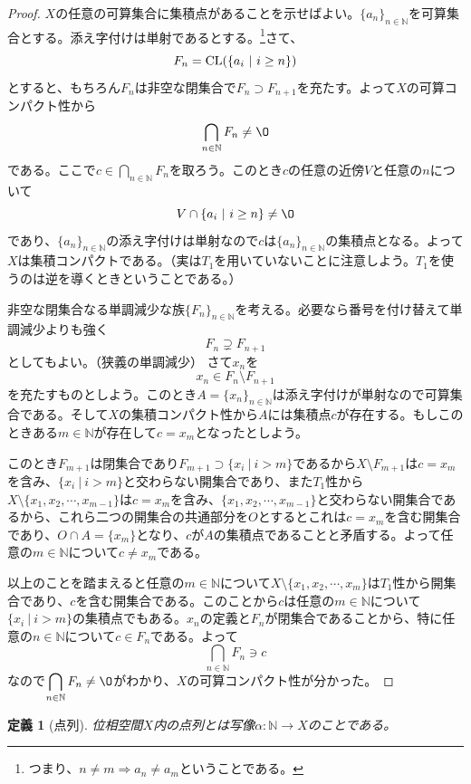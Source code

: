 \documentclass[leqno]{jsarticle}
\newtheorem{df}[thm]{定義}
\newcommand{\nn}{\mathbb{N}}
\newcommand{\al}{\alpha}
\newcommand{\cl}{\text{{\rm CL}}}
\begin{document}
\begin{proof}\par
[可算コンパクト$\Longrightarrow$集積コンパクトの証明]\par
$X$の任意の可算集合に集積点があることを示せばよい。$\{a_n\}_{n\in \mathbb{N}}$を可算集合とする。添え字付けは単射であるとする。\footnote{つまり、$n\neq m\Longrightarrow a_n\neq a_m$ということである。}さて、
\[
F_n=\cl(\{a_i\ |\ i\ge n\})
\]
とすると、もちろん$F_n$は非空な閉集合で$F_n\supset F_{n+1}$を充たす。よって$X$の可算コンパクト性から
\[
\bigcap_{n\in \mathbb{N}}F_n\neq\O
\]
である。ここで$\displaystyle c \in \bigcap_{n\in \mathbb{N}}F_n$を取ろう。このとき$c$の任意の近傍$V$と任意の$n$について
\[
V\cap \{a_i\ |\ i\ge n\}\neq\O
\]
であり、$\{a_n\}_{n\in \mathbb{N}}$の添え字付けは単射なので$c$は$\{a_n\}_{n\in \mathbb{N}}$の集積点となる。よって$X$は集積コンパクトである。（実は$T_1$を用いていないことに注意しよう。$T_1$を使うのは逆を導くときということである。）\par
[可算コンパクト$\Longrightarrow$集積コンパクトの証明終わり]\par
[集積コンパクト$\Longrightarrow$可算コンパクトの証明]\par
非空な閉集合なる単調減少な族$\{F_n\}_{n\in \mathbb{N}}$を考える。必要なら番号を付け替えて単調減少よりも強く
\[
F_n\supsetneq F_{n+1}
\]
としてもよい。（狭義の単調減少）
さて$x_n$を
\[
x_n\in F_n\setminus F_{n+1}
\]
を充たすものとしよう。このとき$A=\{x_n\}_{n\in\mathbb{N}}$は添え字付けが単射なので可算集合である。そして$X$の集積コンパクト性から$A$には集積点$c$が存在する。もしこのときある$m\in \mathbb{N}$が存在して$c=x_m$となったとしよう。
\par このとき$F_{m+1}$は閉集合であり$F_{m+1}\supset\{x_{i}\ |\ i>m\}$であるから$X\setminus F_{m+1}$は$c=x_m$を含み、$\{x_{i}\ |\ i>m\}$と交わらない開集合であり、また$T_1$性から$X\setminus \{x_1,x_2,\cdots ,x_{m-1}\}$は$c=x_m$を含み、$\{x_1,x_2,\cdots ,x_{m-1}\}$と交わらない開集合であるから、これら二つの開集合の共通部分を$O$とするとこれは$c=x_m$を含む開集合であり、$O\cap A=\{x_m\}$となり、$c$が$A$の集積点であることと矛盾する。よって任意の$m\in \mathbb{N}$について$c\neq x_m$である。\par
以上のことを踏まえると任意の$m\in \mathbb{N}$について$X\setminus \{x_1,x_2,\cdots ,x_{m}\}$は$T_1$性から開集合であり、$c$を含む開集合である。このことから$c$は任意の$m\in \mathbb{N}$について$\{x_i\ |\ i>m\}$の集積点でもある。$x_n$の定義と$F_n$が閉集合であることから、特に任意の$n\in \mathbb{N}$について$c\in F_n$である。よって
\[
\bigcap_{n\in \mathbb{N}}F_n\ni c
\]
なので$\displaystyle \bigcap_{n\in \mathbb{N}}F_n\neq \O$がわかり、$X$の可算コンパクト性が分かった。
\end{proof}
\begin{df}[点列]
位相空間$X$内の点列とは写像$\al:\nn\to X$のことである。
\end{df}
\end{document}
